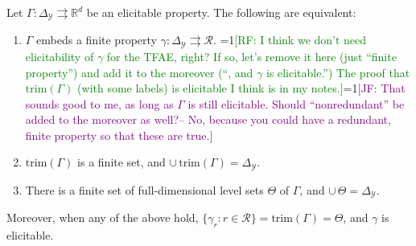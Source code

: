 \documentclass[anon,12pt]{colt2019}
\newcommand{\Comments}{1}
\newcommand{\mynote}[2]{\ifnum\Comments=1\textcolor{#1}{#2}\fi}
\newcommand{\raf}[1]{\mynote{green}{[RF: #1]}}
\newcommand{\jessie}[1]{\mynote{purple}{[JF: #1]}}
\newcommand{\reals}{\mathbb{R}}
\newcommand{\simplex}{\Delta_\Y}
\newcommand{\R}{\mathcal{R}}
\newcommand{\Y}{\mathcal{Y}}
\newcommand{\toto}{\rightrightarrows}
\newcommand{\trim}{\mathrm{trim}}
\begin{document}
\begin{proposition}\label{prop:embed-trim}
  Let $\Gamma:\simplex\toto\reals^d$ be an elicitable property.
  The following are equivalent:
  \begin{enumerate}
  \item $\Gamma$ embeds a finite property $\gamma:\simplex \toto \R$.
    \raf{I think we don't need elicitability of $\gamma$ for the TFAE, right?  If so, let's remove it here (just ``finite property'') and add it to the moreover (``, and $\gamma$ is elicitable.'')  The proof that $\trim(\Gamma)$ (with some labels) is elicitable I think is in my notes.}\jessie{That sounds good to me, as long as $\Gamma$ is still elicitable.  Should ``nonredundant'' be added to the moreover as well?-- No, because you could have a redundant, finite property so that these are true.}
  \item $\trim(\Gamma)$ is a finite set, and $\cup\,\trim(\Gamma) = \simplex$.
  \item There is a finite set of full-dimensional level sets $\Theta$ of $\Gamma$, and $\cup\,\Theta = \simplex$.
  \end{enumerate}
  Moreover, when any of the above hold, $\{\gamma_r : r\in\R\} = \trim(\Gamma) = \Theta$, and $\gamma$ is elicitable.
\end{proposition}
\end{document}
